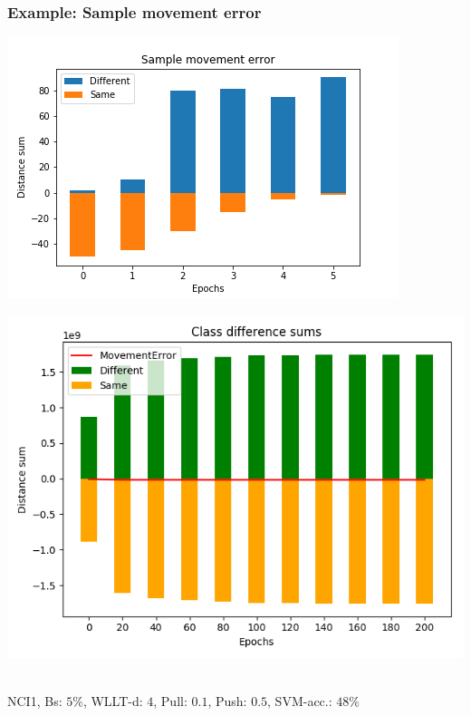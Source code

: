 \begin{frame}\frametitle{Example: Sample movement error}
	\begin{minipage}{0.49\textwidth}
		\includegraphics[width=\textwidth]{images/IdealSME}
	\end{minipage}
	\begin{minipage}{0.49\textwidth}
		\includegraphics[width=\textwidth]{images/plot18ClDiffSums}
	\end{minipage}
	\vspace{2cm} \\
	\tiny{NCI1, Bs: $5\%$, WLLT-d: $4$, Pull: $0.1$, Push: $0.5$, SVM-acc.: $48\%$}
\end{frame}

